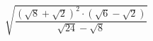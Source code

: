\begin{ex}[type=calculate]
	\begin{condition}
		\( \sqrt{\dfrac{(\sqrt{8}+\sqrt{2})^2\cdot(\sqrt{6}-\sqrt{2})}{\sqrt{24}-\sqrt{8}}} \)
	\end{condition}
\end{ex}